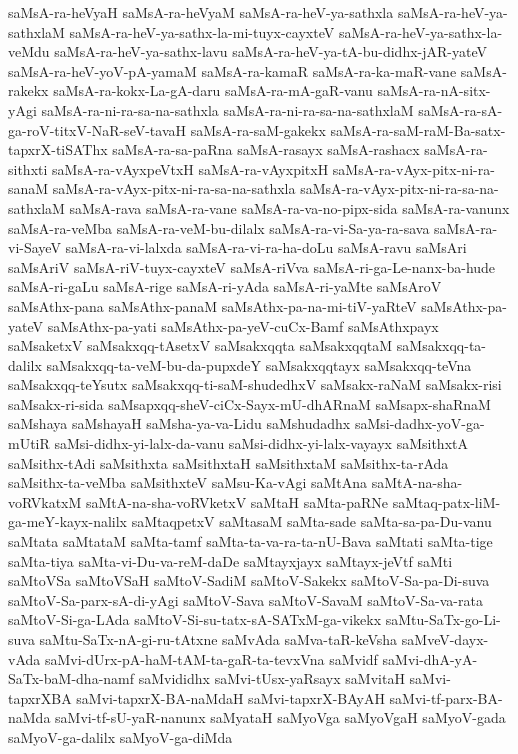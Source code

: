{saMsA-ra-heVyaH
saMsA-ra-heVyaM
saMsA-ra-heV-ya-sathxla
saMsA-ra-heV-ya-sathxlaM
saMsA-ra-heV-ya-sathx-la-mi-tuyx-cayxteV
saMsA-ra-heV-ya-sathx-la-veMdu
saMsA-ra-heV-ya-sathx-lavu
saMsA-ra-heV-ya-tA-bu-didhx-jAR-yateV
saMsA-ra-heV-yoV-pA-yamaM
saMsA-ra-kamaR
saMsA-ra-ka-maR-vane
saMsA-rakekx
saMsA-ra-kokx-La-gA-daru
saMsA-ra-mA-gaR-vanu
saMsA-ra-nA-sitx-yAgi
saMsA-ra-ni-ra-sa-na-sathxla
saMsA-ra-ni-ra-sa-na-sathxlaM
saMsA-ra-sA-ga-roV-titxV-NaR-seV-tavaH
saMsA-ra-saM-gakekx
saMsA-ra-saM-raM-Ba-satx-tapxrX-tiSAThx
saMsA-ra-sa-paRna
saMsA-rasayx
saMsA-rashacx
saMsA-ra-sithxti
saMsA-ra-vAyxpeVtxH
saMsA-ra-vAyxpitxH
saMsA-ra-vAyx-pitx-ni-ra-sanaM
saMsA-ra-vAyx-pitx-ni-ra-sa-na-sathxla
saMsA-ra-vAyx-pitx-ni-ra-sa-na-sathxlaM
saMsA-rava
saMsA-ra-vane
saMsA-ra-va-no-pipx-sida
saMsA-ra-vanunx
saMsA-ra-veMba
saMsA-ra-veM-bu-dilalx
saMsA-ra-vi-Sa-ya-ra-sava
saMsA-ra-vi-SayeV
saMsA-ra-vi-lalxda
saMsA-ra-vi-ra-ha-doLu
saMsA-ravu
saMsAri
saMsAriV
saMsA-riV-tuyx-cayxteV
saMsA-riVva
saMsA-ri-ga-Le-nanx-ba-hude
saMsA-ri-gaLu
saMsA-rige
saMsA-ri-yAda
saMsA-ri-yaMte
saMsAroV
saMsAthx-pana
saMsAthx-panaM
saMsAthx-pa-na-mi-tiV-yaRteV
saMsAthx-pa-yateV
saMsAthx-pa-yati
saMsAthx-pa-yeV-cuCx-Bamf
saMsAthxpayx
saMsaketxV
saMsakxqq-tAsetxV
saMsakxqqta
saMsakxqqtaM
saMsakxqq-ta-dalilx
saMsakxqq-ta-veM-bu-da-pupxdeY
saMsakxqqtayx
saMsakxqq-teVna
saMsakxqq-teYsutx
saMsakxqq-ti-saM-shudedhxV
saMsakx-raNaM
saMsakx-risi
saMsakx-ri-sida
saMsapxqq-sheV-ciCx-Sayx-mU-dhARnaM
saMsapx-shaRnaM
saMshaya
saMshayaH
saMsha-ya-va-Lidu
saMshudadhx
saMsi-dadhx-yoV-ga-mUtiR
saMsi-didhx-yi-lalx-da-vanu
saMsi-didhx-yi-lalx-vayayx
saMsithxtA
saMsithx-tAdi
saMsithxta
saMsithxtaH
saMsithxtaM
saMsithx-ta-rAda
saMsithx-ta-veMba
saMsithxteV
saMsu-Ka-vAgi
saMtAna
saMtA-na-sha-voRVkatxM
saMtA-na-sha-voRVketxV
saMtaH
saMta-paRNe
saMtaq-patx-liM-ga-meY-kayx-nalilx
saMtaqpetxV
saMtasaM
saMta-sade
saMta-sa-pa-Du-vanu
saMtata
saMtataM
saMta-tamf
saMta-ta-va-ra-ta-nU-Bava
saMtati
saMta-tige
saMta-tiya
saMta-vi-Du-va-reM-daDe
saMtayxjayx
saMtayx-jeVtf
saMti
saMtoVSa
saMtoVSaH
saMtoV-SadiM
saMtoV-Sakekx
saMtoV-Sa-pa-Di-suva
saMtoV-Sa-parx-sA-di-yAgi
saMtoV-Sava
saMtoV-SavaM
saMtoV-Sa-va-rata
saMtoV-Si-ga-LAda
saMtoV-Si-su-tatx-sA-SATxM-ga-vikekx
saMtu-SaTx-go-Li-suva
saMtu-SaTx-nA-gi-ru-tAtxne
saMvAda
saMva-taR-keVsha
saMveV-dayx-vAda
saMvi-dUrx-pA-haM-tAM-ta-gaR-ta-tevxVna
saMvidf
saMvi-dhA-yA-SaTx-baM-dha-namf
saMvididhx
saMvi-tUsx-yaRsayx
saMvitaH
saMvi-tapxrXBA
saMvi-tapxrX-BA-naMdaH
saMvi-tapxrX-BAyAH
saMvi-tf-parx-BA-naMda
saMvi-tf-sU-yaR-nanunx
saMyataH
saMyoVga
saMyoVgaH
saMyoV-gada
saMyoV-ga-dalilx
saMyoV-ga-diMda
}
